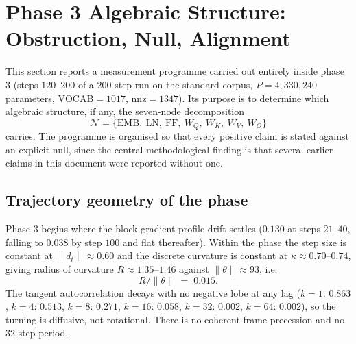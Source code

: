 
\section{Phase 3 Algebraic Structure: Obstruction, Null, Alignment}
\label{sec:phase3-algebra}

This section reports a measurement programme carried out entirely inside
phase 3 (steps $120$--$200$ of a $200$-step run on the standard corpus,
$P = 4{,}330{,}240$ parameters, $\mathrm{VOCAB}=1017$, $\mathrm{nnz}=1347$).
Its purpose is to determine which algebraic structure, if any, the
seven-node decomposition
\[
  \mathcal{N} = \{\mathrm{EMB},\ \mathrm{LN},\ \mathrm{FF},\
  W_Q,\ W_K,\ W_V,\ W_O\}
\]
carries. The programme is organised so that every positive claim is stated
against an explicit null, since the central methodological finding is that
several earlier claims in this document were reported without one.

\subsection{Trajectory geometry of the phase}

Phase 3 begins where the block gradient-profile drift settles
($0.130$ at steps $21$--$40$, falling to $0.038$ by step $100$ and flat
thereafter). Within the phase the step size is constant at
$\|d_t\|\approx 0.60$ and the discrete curvature is constant at
$\kappa \approx 0.70$--$0.74$, giving radius of curvature $R \approx 1.35$--$1.46$
against $\|\theta\|\approx 93$, i.e.
\begin{equation}
  R/\|\theta\| \;=\; 0.015 .
\end{equation}
The tangent autocorrelation decays with no negative lobe at any lag
($k=1{:}\,0.863$, $k=4{:}\,0.513$, $k=8{:}\,0.271$, $k=16{:}\,0.058$,
$k=32{:}\,0.002$, $k=64{:}\,0.002$), so the turning is diffusive, not
rotational. There is no coherent frame precession and no $32$-step period.

